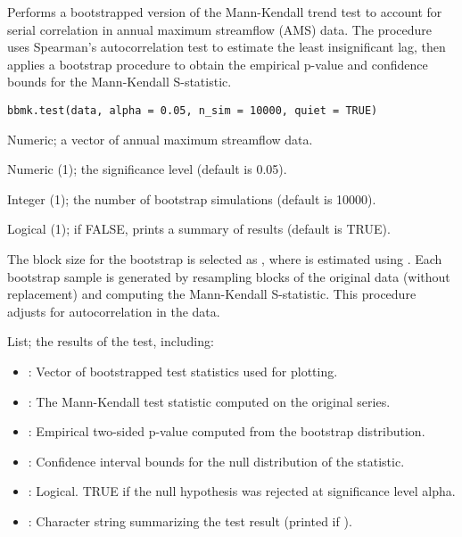 \documentclass[a4paper]{book}
\begin{document}
%
\begin{Description}
Performs a bootstrapped version of the Mann-Kendall trend test to account
for serial correlation in annual maximum streamflow (AMS) data. The procedure
uses Spearman’s autocorrelation test to estimate the least insignificant lag,
then applies a bootstrap procedure to obtain the empirical p-value and confidence
bounds for the Mann-Kendall S-statistic.
\end{Description}
%
\begin{Usage}
\begin{verbatim}
bbmk.test(data, alpha = 0.05, n_sim = 10000, quiet = TRUE)
\end{verbatim}
\end{Usage}
%
\begin{Arguments}
\begin{ldescription}
\item[\code{data}] Numeric; a vector of annual maximum streamflow data.

\item[\code{alpha}] Numeric (1); the significance level (default is 0.05).

\item[\code{n\_sim}] Integer (1); the number of bootstrap simulations (default is 10000).

\item[\code{quiet}] Logical (1); if FALSE, prints a summary of results (default is TRUE).
\end{ldescription}
\end{Arguments}
%
\begin{Details}
The block size for the bootstrap is selected as , where 
is estimated using . Each bootstrap sample is generated by
resampling blocks of the original data  (without replacement) and computing the
Mann-Kendall S-statistic. This procedure adjusts for autocorrelation in the data.
\end{Details}
%
\begin{Value}
List; the results of the test, including:
\begin{itemize}

\item{} : Vector of bootstrapped test statistics used for plotting.
\item{} : The Mann-Kendall test statistic computed on the original series.
\item{} : Empirical two-sided p-value computed from the bootstrap distribution.
\item{} : Confidence interval bounds for the null distribution of the statistic.
\item{} : Logical. TRUE if the null hypothesis was rejected at significance level alpha.
\item{} : Character string summarizing the test result (printed if ).

\end{itemize}

\end{Value}
\end{document}
